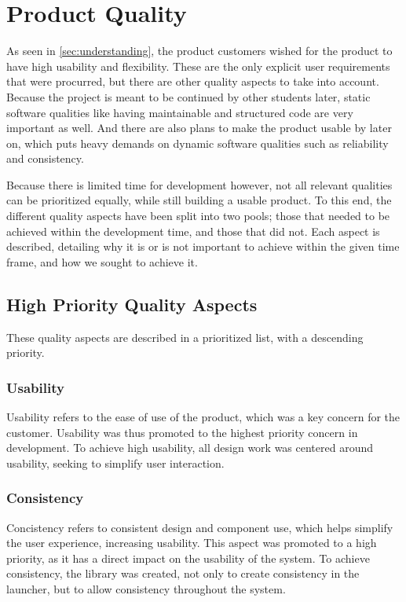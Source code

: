 \section{Product Quality}
\label{product_quality}
As seen in \autoref{sec:understanding}, the product customers wished for the product to have high usability and flexibility. 
These are the only explicit user requirements that were procurred, but there are other quality aspects to take into account. 
Because the project is meant to be continued by other students later, static software qualities like having maintainable and structured code are very important as well. 
And there are also plans to make the product usable by \autists[] later on, which puts heavy demands on dynamic software qualities such as reliability and consistency. \newline

Because there is limited time for development however, not all relevant qualities can be prioritized equally, while still building a usable product. 
To this end, the different quality aspects have been split into two pools; those that needed to be achieved within the development time, and those that did not. 
Each aspect is described, detailing why it is or is not important to achieve within the given time frame, and how we sought to achieve it. 

\subsection{High Priority Quality Aspects}
These quality aspects are described in a prioritized list, with a descending priority. 

\subsubsection{Usability}
Usability refers to the ease of use of the product, which was a key concern for the customer.
Usability was thus promoted to the highest priority concern in development. 
To achieve high usability, all design work was centered around usability, seeking to simplify user interaction. 

\subsubsection{Consistency}
Concistency refers to consistent design and component use, which helps simplify the user experience, increasing usability\citep[page 90]{dieb-book}. 
This aspect was promoted to a high priority, as it has a direct impact on the usability of the system. 
To achieve consistency, the \guicomponents[] library was created, not only to create consistency in the launcher, but to allow consistency throughout the system. 


